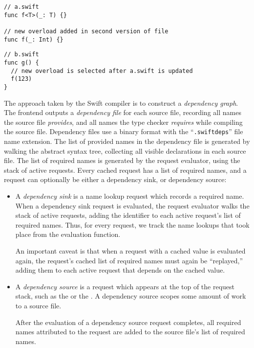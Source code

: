 \documentclass[../generics]{subfiles}
\begin{document}
\begin{listing}\label{incrlisting1}
\begin{Verbatim}
// a.swift
func f<T>(_: T) {}

// new overload added in second version of file
func f(_: Int) {}
\end{Verbatim}
\begin{Verbatim}
// b.swift
func g() {
  // new overload is selected after a.swift is updated
  f(123)
}
\end{Verbatim}
\end{listing}

The approach taken by the Swift compiler is to construct a \emph{dependency graph}. The frontend outputs a \emph{dependency file} for each source file, recording all names the source file \emph{provides}, and all names the type checker \emph{requires} while compiling the source file. Dependency files use a binary format with the ``\texttt{.swiftdeps}'' file name extension. The list of provided names in the dependency file is generated by walking the abstract syntax tree, collecting all visible declarations in each source file. The list of required names is generated by the request evaluator, using the stack of active requests. Every cached request has a list of required names, and a request can optionally be either a dependency sink, or dependency source:
\begin{itemize}
\item A \emph{dependency sink} is a name lookup request which records a required name. When a dependency sink request is evaluated, the request evaluator walks the stack of active requests, adding the identifier to each active request's list of required names. Thus, for every request, we track the name lookups that took place from the evaluation function.

An important caveat is that when a request with a cached value is evaluated again, the request's cached list of required names must again be ``replayed,'' adding them to each active request that depends on the cached value.

\item A \emph{dependency source} is a request which appears at the top of the request stack, such as the  or the . A dependency source scopes some amount of work to a source file.

After the evaluation of a dependency source request completes, all required names attributed to the request are added to the source file's list of required names.
\end{itemize}
\end{document}
